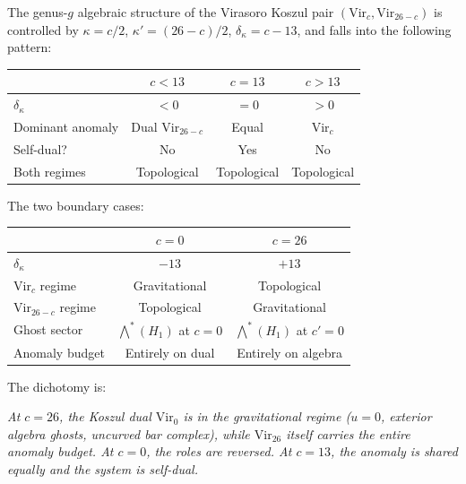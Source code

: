\begin{theorem}
\label{thm:critical-dichotomy-summary}
The genus-$g$ algebraic structure of the Virasoro Koszul pair
$(\mathrm{Vir}_c, \mathrm{Vir}_{26-c})$ is controlled by
$\kappa = c/2$, $\kappa' = (26-c)/2$,
$\delta_\kappa = c - 13$, and falls into the following
pattern:

\begin{center}
\renewcommand{\arraystretch}{1.4}
\begin{tabular}{lccc}
\toprule
& $c < 13$ & $c = 13$ & $c > 13$ \\
\midrule
$\delta_\kappa$ & $< 0$ & $= 0$ & $> 0$ \\
Dominant anomaly & Dual $\mathrm{Vir}_{26-c}$ &
Equal & $\mathrm{Vir}_c$ \\
Self-dual? & No & Yes & No \\
Both regimes & Topological & Topological & Topological \\
\bottomrule
\end{tabular}
\end{center}

\smallskip\noindent
The two boundary cases:
\begin{center}
\renewcommand{\arraystretch}{1.4}
\begin{tabular}{lcc}
\toprule
& $c = 0$ & $c = 26$ \\
\midrule
$\delta_\kappa$ & $-13$ & $+13$ \\
$\mathrm{Vir}_c$ regime & Gravitational & Topological \\
$\mathrm{Vir}_{26-c}$ regime & Topological & Gravitational \\
Ghost sector & $\bigwedge^*(H_1)$ at $c=0$ &
$\bigwedge^*(H_1)$ at $c'=0$ \\
Anomaly budget & Entirely on dual & Entirely on algebra \\
\bottomrule
\end{tabular}
\end{center}

\smallskip\noindent
The dichotomy is:

\emph{At $c = 26$, the Koszul dual $\mathrm{Vir}_0$ is in the
gravitational regime \textup{(}$u = 0$, exterior algebra ghosts,
uncurved bar complex\textup{)}, while $\mathrm{Vir}_{26}$ itself
carries the entire anomaly budget. At $c = 0$, the roles are
reversed. At $c = 13$, the anomaly is shared equally and the system
is self-dual.}
\end{theorem}

